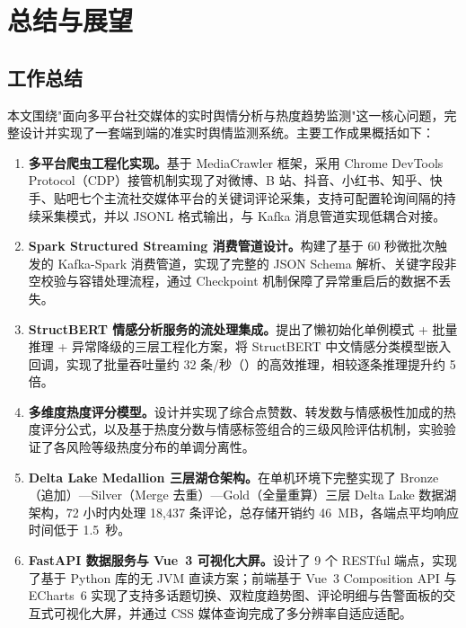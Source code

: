 
\chapter{总结与展望}

\section{工作总结}

本文围绕"面向多平台社交媒体的实时舆情分析与热度趋势监测"这一核心问题，完整设计并实现了一套端到端的准实时舆情监测系统。主要工作成果概括如下：

\begin{enumerate}
  \item \textbf{多平台爬虫工程化实现。}基于 MediaCrawler 框架，采用 Chrome DevTools Protocol（CDP）接管机制实现了对微博、B 站、抖音、小红书、知乎、快手、贴吧七个主流社交媒体平台的关键词评论采集，支持可配置轮询间隔的持续采集模式，并以 JSONL 格式输出，与 Kafka 消息管道实现低耦合对接。

  \item \textbf{Spark Structured Streaming 消费管道设计。}构建了基于 60 秒微批次触发的 Kafka-Spark 消费管道，实现了完整的 JSON Schema 解析、关键字段非空校验与容错处理流程，通过 Checkpoint 机制保障了异常重启后的数据不丢失。

  \item \textbf{StructBERT 情感分析服务的流处理集成。}提出了懒初始化单例模式 + 批量推理 + 异常降级的三层工程化方案，将 StructBERT 中文情感分类模型嵌入  回调，实现了批量吞吐量约 32 条/秒（）的高效推理，相较逐条推理提升约 5 倍。

  \item \textbf{多维度热度评分模型。}设计并实现了综合点赞数、转发数与情感极性加成的热度评分公式，以及基于热度分数与情感标签组合的三级风险评估机制，实验验证了各风险等级热度分布的单调分离性。

  \item \textbf{Delta Lake Medallion 三层湖仓架构。}在单机环境下完整实现了 Bronze（追加）—Silver（Merge 去重）—Gold（全量重算）三层 Delta Lake 数据湖架构，72 小时内处理 18,437 条评论，总存储开销约 46~MB，各端点平均响应时间低于 1.5~秒。

  \item \textbf{FastAPI 数据服务与 Vue~3 可视化大屏。}设计了 9 个 RESTful 端点，实现了基于  Python 库的无 JVM 直读方案；前端基于 Vue~3 Composition API 与 ECharts~6 实现了支持多话题切换、双粒度趋势图、评论明细与告警面板的交互式可视化大屏，并通过 CSS 媒体查询完成了多分辨率自适应适配。
\end{enumerate}

